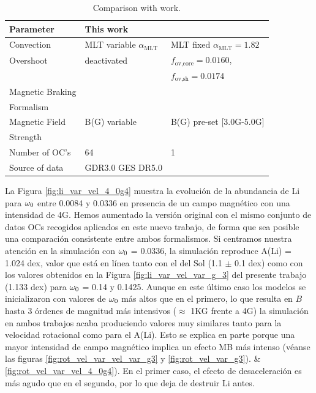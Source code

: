 \begin{table}
	\centering
	\begin{threeparttable}
		\begin{tabular}{lll} 
			\hline
			Parameter & This work & \cite{Caballero2020}\\
			\hline
			Convection & MLT variable $\alpha_{\textrm{MLT}}$ & MLT fixed $\alpha_{\textrm{MLT}}=1.82$\\
			Overshoot & deactivated & $f_{\textrm{ov,core}}=0.0160$,\\ & & $f_{\textrm{ov,sh}}=0.0174$\\
			Magnetic Braking & \cite{Gallet2013} & \cite{Ud-Doula2008} \\ Formalism & & \\
			Magnetic Field & B(G) variable & B(G) pre-set [3.0G-5.0G]\\ Strength & & \\
			Number of OC's & 64 & 1 \\
			Source of data & GDR3.0 GES DR5.0 & \cite{Sestito2005} \\
			\hline
		\end{tabular}
	\end{threeparttable}
	\caption{Comparison with \cite{Caballero2020} work.}
	\label{tab:caballero2023_2020}
\end{table}

La Figura \ref{fig:li_var_vel_4_0g4} muestra la evolución de la abundancia de Li para $\omega_{\mathrm{0}}$ entre 0.0084 y 0.0336 en presencia de un campo magnético con una intensidad de 4G. Hemos aumentado la versión original con el mismo conjunto de datos OCs recogidos aplicados en este nuevo trabajo, de forma que sea posible una comparación consistente entre ambos formalismos. Si centramos nuestra atención en la simulación con $\omega_{\mathrm{0}}$ = 0.0336, la simulación reproduce A(Li) = 1.024 dex, valor que está en línea tanto con el del Sol (1.1 $\pm$ 0.1 dex) como con los valores obtenidos en la Figura \ref{fig:li_var_vel_var_g_3} del presente trabajo (1.133 dex) para $\omega_{\mathrm{0}}$ = 0.14 y 0.1425. Aunque en este último caso los modelos se inicializaron con valores de $\omega_{\mathrm{0}}$ más altos que en el primero, lo que resulta en $B$ hasta 3 órdenes de magnitud más intensivos ($\approx$ 1KG frente a 4G) la simulación en ambos trabajos acaba produciendo valores muy similares tanto para la velocidad rotacional como para el A(Li). Esto se explica en parte porque una mayor intensidad de campo magnético implica un efecto MB más intenso (véanse las figuras \ref{fig:rot_vel_var_vel_var_g3} y \ref{fig:rot_vel_var_g3}). \& \ref{fig:rot_vel_var_vel_4_0g4}). En el primer caso, el efecto de desaceleración es más agudo que en el segundo, por lo que deja de destruir Li antes.\par

